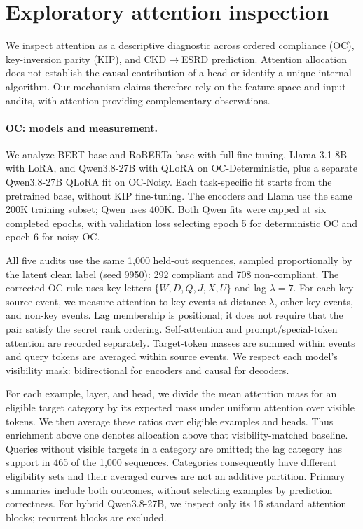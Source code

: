 \section{Exploratory attention inspection}
\label{appendix:attention}

We inspect attention as a descriptive diagnostic across ordered compliance (OC),
key-inversion parity (KIP), and CKD$\to$ESRD prediction. Attention allocation does
not establish the causal contribution of a head or identify a unique internal
algorithm. Our mechanism claims therefore rely on the feature-space and input
audits, with attention providing complementary observations.

\paragraph{OC: models and measurement.}
We analyze BERT-base and RoBERTa-base with full fine-tuning,
Llama-3.1-8B with LoRA, and Qwen3.8-27B with QLoRA on OC-Deterministic,
plus a separate Qwen3.8-27B QLoRA fit on OC-Noisy. Each task-specific fit starts
from the pretrained base, without KIP fine-tuning. The encoders and Llama use
the same 200K training subset; Qwen uses 400K. Both Qwen fits were capped at
six completed epochs, with validation loss selecting epoch 5 for deterministic
OC and epoch 6 for noisy OC.

All five audits use the same 1,000 held-out sequences, sampled proportionally
by the latent clean label (seed 9950): 292 compliant and 708 non-compliant. The corrected
OC rule uses key letters $\{W,D,Q,J,X,U\}$ and lag $\lambda=7$.
For each key-source event, we measure attention to key events at distance
$\lambda$, other key events, and non-key events. Lag membership is positional;
it does not require that the pair satisfy the secret rank ordering. Self-attention
and prompt/special-token attention are recorded separately. Target-token masses
are summed within events and query tokens are averaged within source events.
We respect each model's visibility mask: bidirectional for encoders and causal
for decoders.

For each example, layer, and head, we divide the mean attention mass for an
eligible target category by its expected mass under uniform attention over
visible tokens. We then average these ratios over eligible examples and heads.
Thus enrichment above one denotes allocation above that visibility-matched
baseline. Queries without visible targets in a category are omitted; the lag
category has support in 465 of the 1,000 sequences. Categories consequently
have different eligibility sets and their averaged curves are not an additive
partition. Primary summaries include both outcomes, without selecting examples
by prediction correctness. For hybrid Qwen3.8-27B, we inspect only its 16 standard
attention blocks; recurrent blocks are excluded.


